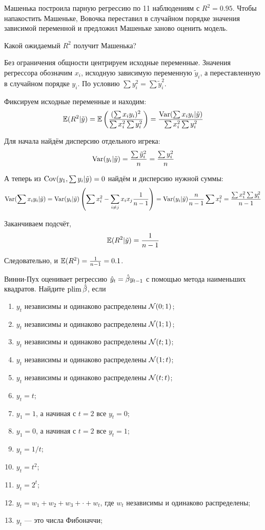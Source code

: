 \begin{problem}
Машенька построила парную регрессию по 11 наблюдениям с $R^2=0.95$. Чтобы напакостить Машеньке, Вовочка переставил в случайном порядке значения зависимой переменной и предложил Машеньке заново оценить модель.

Какой ожидаемый $R^2$ получит Машенька?
\begin{sol}
Без ограничения общности центрируем исходные переменные. 
Значения регрессора обозначим $x_i$, исходную зависимую переменную $\tilde{y}_i$, а переставленную в случайном порядке $y_i$. 
По условию $\sum y_i^2 = \sum \tilde{y}_i^2$.

Фиксируем исходные переменные и находим:
\[
\mathbb{E}(R^2 | \tilde{y}) = \mathbb{E}\left( \frac{(\sum x_i y_i )^2}{\sum x_i^2 \sum y_i^2}  \right) = 
\frac{\operatorname{Var}(\sum x_i y_i | \tilde{y})}{\sum x_i^2 \sum y_i^2}
\]

Для начала найдём дисперсию отдельного игрека:
\[
\operatorname{Var}(y_i | \tilde{y}) = \frac{\sum \tilde{y}_i^2}{n} = \frac{\sum y_i^2}{n}
\]

А теперь из $\operatorname{Cov}(y_1, \sum y_i | \tilde{y}) =0$ найдём и дисперсию нужной суммы:
\[
\operatorname{Var}(\sum x_i y_i | \tilde{y}) = 
\operatorname{Var}(y_i | \tilde{y}) \left(  \sum x_i^2 - \sum_{i\neq j} x_i x_j \frac{1}{n-1}  \right) = 
\operatorname{Var}(y_i | \tilde{y}) \frac{n}{n-1} \sum x_i^2 = \frac{\sum x_i^2 \sum y_i^2 }{n-1}
\]

Заканчиваем подсчёт,
\[
\mathbb{E}(R^2 | \tilde{y}) = \frac{1}{n-1}
\]

Следовательно, и $\mathbb{E}(R^2) = \frac{1}{n-1} = 0.1$.
\end{sol}
\end{problem}

\begin{problem}
	Винни-Пух оценивает регрессию $\hat{y}_t = \hat{\beta} y_{t-1}$ с помощью метода наименьших квадратов.
	Найдите $\operatorname*{plim} \hat{\beta}$, если
\begin{enumerate}
	\item $y_t$ независимы и одинаково распределены $\mathcal{N}(0; 1)$;
	\item $y_t$ независимы и одинаково распределены $\mathcal{N}(1; 1)$;
	\item $y_t$ независимы и одинаково распределены $\mathcal{N}(t; 1)$;
	\item $y_t$ независимы и одинаково распределены $\mathcal{N}(1; t)$;
	\item $y_t$ независимы и одинаково распределены $\mathcal{N}(t; t)$;
	\item $y_t = t$;
	\item $y_1 = 1$, а начиная с $t=2$ все $y_t=0$;
	\item $y_1 = 0$, а начиная с $t=2$ все $y_t=1$;
	\item $y_t = 1/t$;
	\item $y_t = t^2$;
	\item $y_t= 2^t$;
	\item $y_t = w_1 + w_2 + w_3 + \cdot + w_t$, где $w_t$ независимы и одинаково распределены;
	\item $y_t$ — это числа Фибоначчи;
\end{enumerate}

\begin{sol}
\end{sol}
\end{problem}

